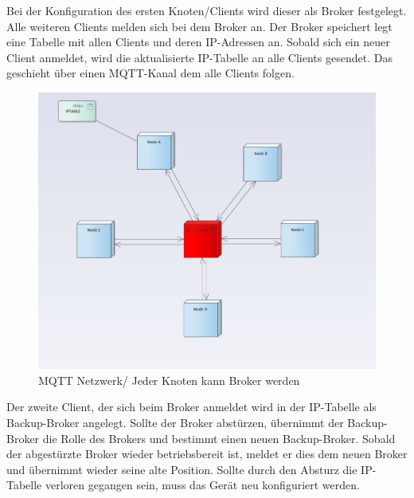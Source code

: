 \documentclass[conference]{IEEEtran}
\begin{document}
Bei der Konfiguration des ersten Knoten/Clients wird dieser als Broker festgelegt. Alle weiteren Clients melden sich bei dem Broker an. Der Broker speichert legt eine Tabelle mit allen Clients und deren IP-Adressen an. Sobald sich ein neuer Client anmeldet, wird die aktualisierte IP-Tabelle an alle Clients gesendet. Das geschieht über einen MQTT-Kanal dem alle Clients folgen.

\begin{figure}[h]
    \centering
    \includegraphics[width=1\linewidth]{network_scratch.jpg}
    \caption{MQTT Netzwerk/ Jeder Knoten kann Broker werden}
    \label{fig:statemachine}
\end{figure}

Der zweite Client, der sich beim Broker anmeldet wird in der IP-Tabelle als Backup-Broker angelegt. Sollte der Broker abstürzen, übernimmt der Backup-Broker die Rolle des Brokers und bestimmt einen neuen Backup-Broker. Sobald der abgestürzte Broker wieder betriebsbereit ist, meldet er dies dem neuen Broker und übernimmt wieder seine alte Position. Sollte durch den Absturz die IP-Tabelle verloren gegangen sein, muss das Gerät neu konfiguriert werden.
\end{document}
